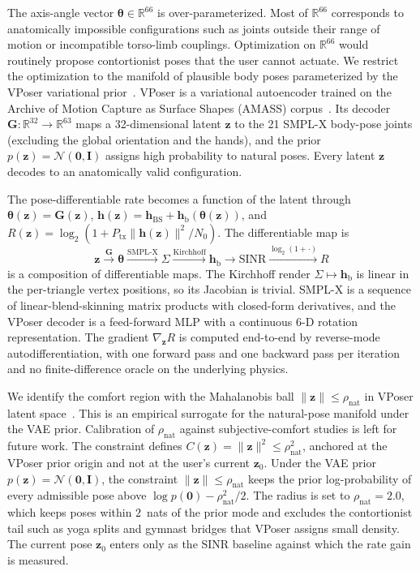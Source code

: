 \documentclass[journal,twocolumn,10pt]{IEEEtran}
\theoremstyle{plain}
\theoremstyle{definition}
\theoremstyle{remark}
\newcommand{\hh}{\bm{h}}
\newcommand{\thetab}{\bm{\theta}}
\newcommand{\hBS}{\bm{h}_{\mathrm{BS}}}
\newcommand{\hbody}{\bm{h}_{\mathrm{b}}}
\newcommand{\Reals}{\mathbb{R}}
\begin{document}
The axis-angle vector $\thetab \in \Reals^{66}$ is over-parameterized.
Most of $\Reals^{66}$ corresponds to anatomically impossible
configurations such as joints outside their range of motion or
incompatible torso-limb couplings. Optimization on $\Reals^{66}$
would routinely propose contortionist poses that the user cannot
actuate. We restrict the optimization to the manifold of plausible
body poses parameterized by the VPoser variational
prior~\cite{Pavlakos2019VPoser}. VPoser is a variational autoencoder
trained on the Archive of Motion Capture as Surface Shapes
(AMASS) corpus~\cite{AMASS2019}. Its
decoder $\bm{G}: \Reals^{32} \to \Reals^{63}$ maps a 32-dimensional
latent $\bm{z}$ to the 21 SMPL-X body-pose joints (excluding the
global orientation and the hands), and the prior
$p(\bm{z}) = \mathcal{N}(\bm{0}, \bm{I})$ assigns high probability
to natural poses. Every latent $\bm{z}$ decodes to an anatomically
valid configuration.

The pose-differentiable rate becomes a function of the latent
through $\thetab(\bm{z}) = \bm{G}(\bm{z})$,
$\hh(\bm{z}) = \hBS + \hbody(\thetab(\bm{z}))$, and
$R(\bm{z}) = \log_2(1 + P_{\mathrm{tx}}\|\hh(\bm{z})\|^{2}/N_0)$.
The differentiable map is
\begin{equation}\label{eq:autodiff-composition}
\bm{z} \xrightarrow{\bm{G}} \thetab \xrightarrow{\mathrm{SMPL\text{-}X}}
\Sigma \xrightarrow{\mathrm{Kirchhoff}} \hbody \xrightarrow{}
\mathrm{SINR} \xrightarrow{\log_2(1 + \cdot)} R
\end{equation}
is a composition of differentiable maps. The Kirchhoff render
$\Sigma \mapsto \hbody$ is linear in the per-triangle vertex
positions, so its Jacobian is trivial. SMPL-X is a sequence of
linear-blend-skinning matrix products with closed-form derivatives,
and the VPoser decoder is a feed-forward MLP with a continuous
6-D rotation representation. The gradient $\nabla_{\bm{z}} R$ is
computed end-to-end by reverse-mode autodifferentiation, with one
forward pass and one backward pass per iteration and no
finite-difference oracle on the underlying physics.

We identify the comfort region with the Mahalanobis ball
$\|\bm{z}\| \leq \rho_\mathrm{nat}$ in VPoser latent
space~\cite{Pavlakos2019VPoser}. This is an empirical surrogate for
the natural-pose manifold under the VAE prior. Calibration of
$\rho_\mathrm{nat}$ against subjective-comfort studies is left for
future work. The constraint defines
$C(\bm{z}) = \|\bm{z}\|^{2} \leq \rho_\mathrm{nat}^{2}$, anchored
at the VPoser prior origin and not at the user's current $\bm{z}_0$.
Under the VAE prior
$p(\bm{z}) = \mathcal{N}(\bm{0},\bm{I})$, the constraint
$\|\bm{z}\| \leq \rho_\mathrm{nat}$ keeps the prior log-probability
of every admissible pose above
$\log p(\bm{0}) - \rho_\mathrm{nat}^{2}/2$. The radius is set to
$\rho_\mathrm{nat} = 2.0$, which keeps poses within $2$~nats of the
prior mode and excludes the contortionist tail such as yoga splits
and gymnast bridges that VPoser assigns small density. The current
pose $\bm{z}_0$ enters only as the SINR baseline against which the
rate gain is measured.
\end{document}
